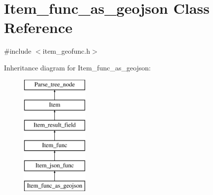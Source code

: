 \hypertarget{classItem__func__as__geojson}{}\section{Item\+\_\+func\+\_\+as\+\_\+geojson Class Reference}
\label{classItem__func__as__geojson}


{\ttfamily \#include $<$item\+\_\+geofunc.\+h$>$}

Inheritance diagram for Item\+\_\+func\+\_\+as\+\_\+geojson\+:\begin{figure}[H]
\begin{center}
\leavevmode
\includegraphics[height=6.000000cm]{classItem__func__as__geojson}
\end{center}
\end{figure}
